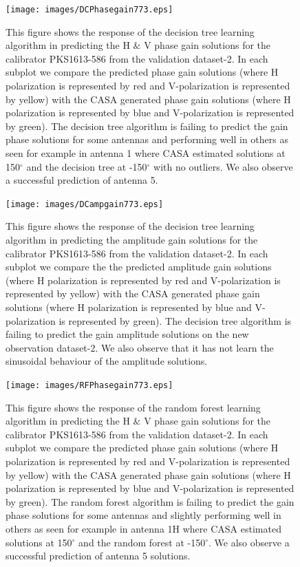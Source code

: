 \begin{figure}[H]
    \texttt{[image: images/DCPhasegain773.eps]}
    \caption{This figure shows the response of the decision tree learning algorithm in predicting the H $\&$ V phase gain solutions for the calibrator PKS1613-586 from the validation dataset-2. In each subplot we compare the predicted phase gain solutions (where H polarization is represented by red and V-polarization is represented by yellow) with the CASA generated phase gain solutions (where H polarization is represented by blue and V-polarization is represented by green). The decision tree algorithm is failing to predict the gain phase solutions for some antennas and performing well in others as seen for example in antenna 1 where CASA estimated solutions at 150$^\circ$ and the decision tree at -150$^\circ$ with no outliers. We also observe a successful prediction of antenna 5.}
    \label{obs9}
\end{figure}

\begin{figure}[H]
    \texttt{[image: images/DCampgain773.eps]}
    \caption{This figure shows the response of the decision tree learning algorithm in predicting the amplitude gain solutions for the calibrator PKS1613-586 from the validation dataset-2. In each subplot we compare the the predicted amplitude gain solutions (where H polarization is represented by red and V-polarization is represented by yellow) with the CASA generated phase gain solutions (where H polarization is represented by blue and V-polarization is represented by green). The decision tree algorithm is failing to predict the gain amplitude solutions on the new observation dataset-2. We also observe that it has not learn the sinusoidal behaviour of the amplitude solutions.}
     \label{da3}
\end{figure}


\begin{figure}[H]
    \texttt{[image: images/RFPhasegain773.eps]}
    \caption{This figure shows the response of the random forest learning algorithm in predicting the H $\&$ V phase gain solutions for the calibrator PKS1613-586 from the validation dataset-2. In each subplot we compare the predicted phase gain solutions (where H polarization is represented by red and V-polarization is represented by yellow) with the CASA generated phase gain solutions (where H polarization is represented by blue and V-polarization is represented by green). The random forest algorithm is failing to predict the gain phase solutions for some antennas and slightly performing well in others as seen for example in antenna 1H where CASA estimated solutions at 150$^\circ$ and the random forest at -150$^\circ$. We also observe a successful prediction of antenna 5 solutions.}
    \label{obs10}
\end{figure}

